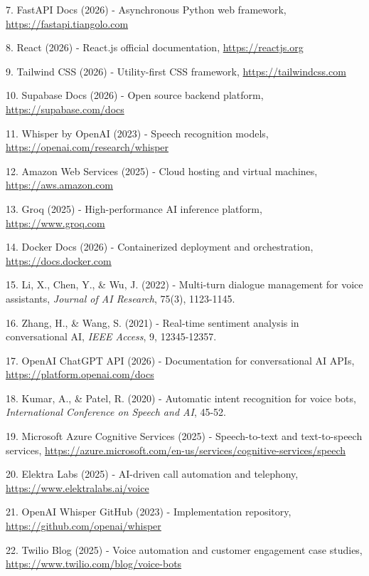 \documentclass[12pt,a4paper]{report}
\begin{document}
7. FastAPI Docs (2026) - Asynchronous Python web framework, \url{https://fastapi.tiangolo.com}  

8. React (2026) - React.js official documentation, \url{https://reactjs.org}  

9. Tailwind CSS (2026) - Utility-first CSS framework, \url{https://tailwindcss.com}  

10. Supabase Docs (2026) - Open source backend platform, \url{https://supabase.com/docs}  

11. Whisper by OpenAI (2023) - Speech recognition models, \url{https://openai.com/research/whisper}  

12. Amazon Web Services (2025) - Cloud hosting and virtual machines, \url{https://aws.amazon.com}  

13. Groq (2025) - High-performance AI inference platform, \url{https://www.groq.com}  

14. Docker Docs (2026) - Containerized deployment and orchestration, \url{https://docs.docker.com}  

15. Li, X., Chen, Y., & Wu, J. (2022) - Multi-turn dialogue management for voice assistants, \textit{Journal of AI Research}, 75(3), 1123-1145.  

16. Zhang, H., & Wang, S. (2021) - Real-time sentiment analysis in conversational AI, \textit{IEEE Access}, 9, 12345-12357.  

17. OpenAI ChatGPT API (2026) - Documentation for conversational AI APIs, \url{https://platform.openai.com/docs}  

18. Kumar, A., & Patel, R. (2020) - Automatic intent recognition for voice bots, \textit{International Conference on Speech and AI}, 45-52.  

19. Microsoft Azure Cognitive Services (2025) - Speech-to-text and text-to-speech services, \url{https://azure.microsoft.com/en-us/services/cognitive-services/speech}  

20. Elektra Labs (2025) - AI-driven call automation and telephony, \url{https://www.elektralabs.ai/voice}  

21. OpenAI Whisper GitHub (2023) - Implementation repository, \url{https://github.com/openai/whisper}  

22. Twilio Blog (2025) - Voice automation and customer engagement case studies, \url{https://www.twilio.com/blog/voice-bots}
\end{document}

